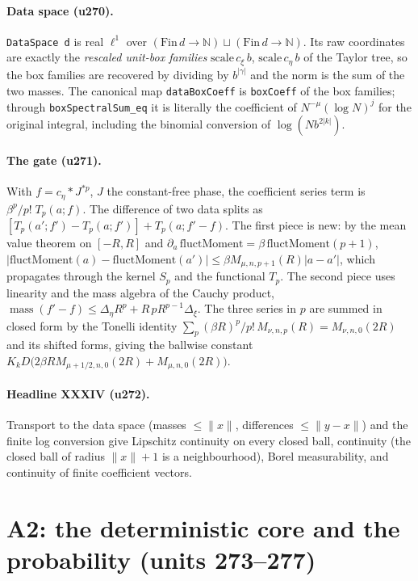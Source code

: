\documentclass[11pt]{article}
\begin{document}
\paragraph{Data space (u270).} \texttt{DataSpace d} is real $\ell^1$ over
$(\mathrm{Fin}\,d\to\mathbb N)\sqcup(\mathrm{Fin}\,d\to\mathbb N)$. Its raw coordinates are exactly the
\emph{rescaled unit-box families} $\mathrm{scale}\,c_\xi\,b$, $\mathrm{scale}\,c_\eta\,b$ of the Taylor
tree, so the box families are recovered by dividing by $b^{|\gamma|}$ and the norm is the sum of the two
masses. The canonical map \texttt{dataBoxCoeff} is \texttt{boxCoeff} of the box families; through
\texttt{boxSpectralSum\_eq} it is literally the coefficient of $N^{-\mu}(\log N)^j$ for the original
integral, including the binomial conversion of $\log(Nb^{2|k|})$.
\paragraph{The gate (u271).} With $f=c_\eta*J^{*p}$, $J$ the constant-free phase, the coefficient series
term is $\beta^p/p!\;T_p(a;f)$. The difference of two data splits as
$[T_p(a';f')-T_p(a;f')]+T_p(a;f'-f)$. The first piece is new: by the mean value theorem on $[-R,R]$ and
$\partial_a\,\mathrm{fluctMoment}=\beta\,\mathrm{fluctMoment}(p{+}1)$,
$|\mathrm{fluctMoment}(a)-\mathrm{fluctMoment}(a')|\le\beta M_{\mu,n,p+1}(R)|a-a'|$, which propagates through
the kernel $S_p$ and the functional $T_p$. The second piece uses linearity and the mass algebra of the
Cauchy product, $\operatorname{mass}(f'-f)\le\Delta_\eta R^p+R\,pR^{p-1}\Delta_\xi$. The three series in
$p$ are summed in closed form by the Tonelli identity $\sum_p(\beta R)^p/p!\,M_{\nu,n,p}(R)=M_{\nu,n,0}(2R)$
and its shifted forms, giving the ballwise constant
$K_kD\bigl(2\beta RM_{\mu+1/2,n,0}(2R)+M_{\mu,n,0}(2R)\bigr)$.
\paragraph{Headline XXXIV (u272).} Transport to the data space (masses $\le\|x\|$, differences
$\le\|y-x\|$) and the finite log conversion give Lipschitz continuity on every closed ball, continuity
(the closed ball of radius $\|x\|+1$ is a neighbourhood), Borel measurability, and continuity of finite
coefficient vectors.

\section{A2: the deterministic core and the probability (units 273--277)}
\end{document}
